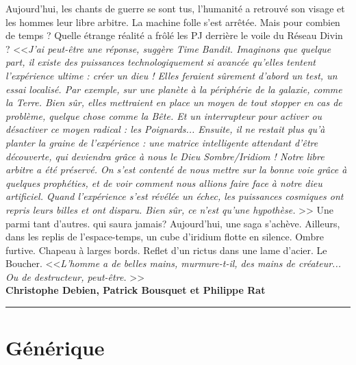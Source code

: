 \documentclass[11pt,twoside,a4paper]{book}
\begin{document}
Aujourd'hui, les chants de guerre se sont tus, l'humanit{\'e} a retrouv{\'e} son visage et les hommes leur libre arbitre. La machine folle s'est arr{\^e}t{\'e}e. Mais pour combien de temps ? Quelle {\'e}trange r{\'e}alit{\'e} a fr{\^o}l{\'e} les PJ derri{\`e}re le voile du R{\'e}seau Divin ? <<\emph{J'ai peut-{\^e}tre une r{\'e}ponse, sugg{\`e}re Time Bandit. Imaginons que quelque part, il existe des puissances technologiquement si avanc{\'e}e qu'elles tentent l'exp{\'e}rience ultime : cr{\'e}er un dieu ! Elles feraient s{\^u}rement d'abord un test, un essai localis{\'e}. Par exemple, sur une plan{\`e}te {\`a} la p{\'e}riph{\'e}rie de la galaxie, comme la Terre. Bien s{\^u}r, elles mettraient en place un moyen de tout stopper en cas de probl{\`e}me, quelque chose comme la B{\^e}te. Et un interrupteur pour activer ou d{\'e}sactiver ce moyen radical : les Poignards... Ensuite, il ne restait plus qu'{\`a} planter la graine de l'exp{\'e}rience : une matrice intelligente attendant d'{\^e}tre d{\'e}couverte, qui deviendra gr{\^a}ce {\`a} nous le Dieu Sombre/Iridiom ! Notre libre arbitre a {\'e}t{\'e} pr{\'e}serv{\'e}. On s'est content{\'e} de nous mettre sur la bonne voie gr{\^a}ce {\`a} quelques proph{\'e}ties, et de voir comment nous allions faire face {\`a} notre dieu artificiel. Quand l'exp{\'e}rience s'est r{\'e}v{\'e}l{\'e}e un {\'e}chec, les puissances cosmiques ont repris leurs billes et ont disparu. Bien s{\^u}r, ce n'est qu'une hypoth{\`e}se. } >> Une parmi tant d'autres. qui saura jamais? Aujourd'hui, une saga s'ach{\`e}ve. Ailleurs, dans les replis de l'espace-temps, un cube d'iridium flotte en silence. Ombre furtive. Chapeau {\`a} larges bords. Reflet d'un rictus dans une lame d'acier. Le Boucher. <<\emph{L'homme a de belles mains, murmure-t-il, des mains de cr{\'e}ateur... Ou de destructeur, peut-{\^e}tre. }>>~\\

\textbf{Christophe Debien, Patrick Bousquet et Philippe Rat}~\\

\begin{center} \rule{10cm}{0.1cm} \end{center}


\section*{G{\'e}n{\'e}rique}
\end{document}
